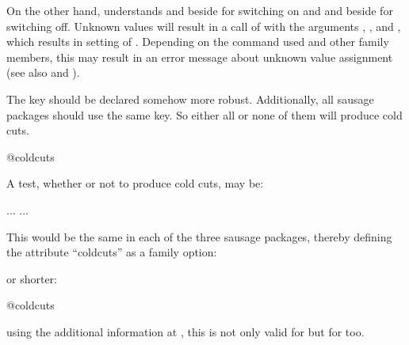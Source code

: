 On the other hand,  understands  
and  beside  for switching on and  and
 beside  for switching off. Unknown values will result
in a call of  with the arguments ,
, and , which results in setting of
. Depending on the command used and other family
members, this may result in an error message about unknown value assignment
(see also  and
).
\begin{Example}
  The key  should be declared somehow more
  robust. Additionally, all sausage packages should use the same key. So
  either all or none of them will produce cold cuts.
\begin{lstcode}
                         {@coldcuts}
\end{lstcode}
  A test, whether or not to produce cold cuts, may be:
\begin{lstcode}
  \if@coldcuts
     ...
  \else
     ...
  \fi
\end{lstcode}
  This would be the same in each of the three sausage packages, thereby
  defining the attribute ``coldcuts'' as a family option:
  or shorter:
\begin{lstcode}
                           {@coldcuts}
\end{lstcode}
  using the additional information at
  , this is not only valid
  for  but for  too.
\end{Example}
%
%


